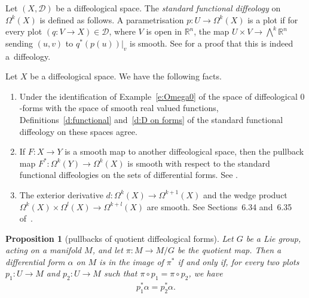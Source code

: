 \documentclass[11pt]{article}
\numberwithin{equation}{section}
\newtheorem{Proposition}[Theorem]{Proposition}
\newcommand{\RR}{{\mathbb{R}}} %
\def \calD {{\mathcal{D}}}
\newcommand{\hypref}[2]{{#2~\ref{#1}}}
\begin{document}
\begin{Definition}
\label{d:D on forms}
Let $(X,\calD)$ be a dif\/feological space.
The \emph{standard functional diffeology} on $\Omega^k(X)$
is def\/ined as follows.
A parametrisation $p \colon U \to \Omega^k(X)$ is a plot
if for every plot $(q \colon V \to X) \in \mathcal{D}$,
where $V$ is open in $\RR^n$, the map $U \times V \to \bigwedge^k \RR^n$
sending $(u,v)$ to $q^*(p(u))|_v$ is smooth.
See \cite[Section~6.29]{iglesias} for a proof that this is indeed a~dif\/feology.
\end{Definition}

\begin{Remark}\label{r:formfacts}
Let $X$ be a dif\/feological space.
We have the following facts.
\begin{enumerate}\itemsep=0pt

\item %
Under the identif\/ication of \hypref{e:Omega0}{Example}
of the space of dif\/feological $0$-forms
with the space of smooth real valued functions,
Def\/initions~\ref{d:functional} and~\ref{d:D on forms}
of the standard functional dif\/feology on these spaces agree.

\item \label{f:pullback is sm}
If $F \colon X \to Y$ is a smooth map to another dif\/feological space,
then the pullback map $F^* \colon \Omega^k(Y) \to \Omega^k(X)$
is smooth with respect to the standard functional dif\/feologies
on the sets of dif\/ferential forms.
See \cite[Section~6.32]{iglesias}.

\item
The exterior derivative
$d \colon \Omega^k(X)\to\Omega^{k+1}(X)$ and the wedge product
$ \Omega^k (X) \times \Omega^l (X) \to \Omega^{k+l} (X)$ are smooth.
See Sections~6.34 and~6.35 of~\cite{iglesias}.
\end{enumerate}
\end{Remark}

\begin{Proposition}[pullbacks of quotient dif\/feological forms]\label{p:pullbackimgchar}
Let $G$ be a Lie group, acting on a manifold $M$,
and let $\pi \colon M \to M/G$ be the quotient map.
Then a differential form $\alpha$ on $M$ is in the image of $\pi^*$
if and only if, for every two plots $p_1 \colon U\to M$
and $p_2 \colon U \to M$ such that $\pi \circ p_1 = \pi \circ p_2$, we have
\begin{gather*} p_1^* \alpha = p_2^* \alpha. \end{gather*}
\end{Proposition}
\end{document}
